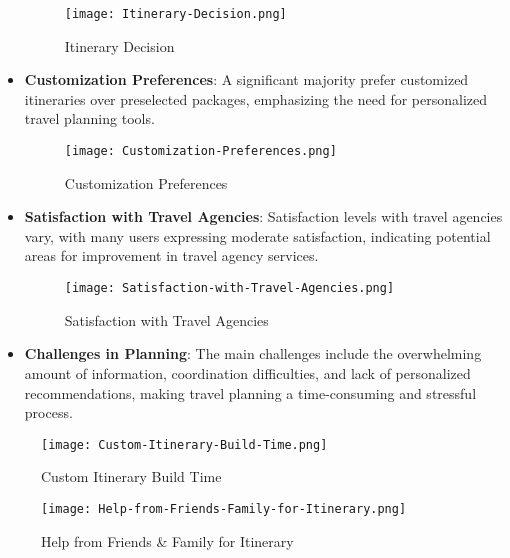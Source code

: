 \documentclass[conference]{IEEEtran}
\begin{document}
\begin{itemize}
\begin{figure}
                \centering
                \texttt{[image: Itinerary-Decision.png]}
                \caption{Itinerary Decision}
                \label{fig:itenary-decision}
            \end{figure}
            \item \textbf{Customization Preferences}: A significant majority prefer customized itineraries over preselected packages, emphasizing the need for personalized travel planning tools.
            \begin{figure}
                \centering
                \texttt{[image: Customization-Preferences.png]}
                \caption{Customization Preferences}
                \label{fig:customization-preferences}
            \end{figure}
            \item \textbf{Satisfaction with Travel Agencies}: Satisfaction levels with travel agencies vary, with many users expressing moderate satisfaction, indicating potential areas for improvement in travel agency services.
            \begin{figure}
                \centering
                \texttt{[image: Satisfaction-with-Travel-Agencies.png]}
                \caption{Satisfaction with Travel Agencies}
                \label{fig:satisfaction-with-travel-agencies}
            \end{figure}
            \item \textbf{Challenges in Planning}: The main challenges include the overwhelming amount of information, coordination difficulties, and lack of personalized recommendations, making travel planning a time-consuming and stressful process.
        \end{itemize}
            \begin{figure}
                \centering
                \texttt{[image: Custom-Itinerary-Build-Time.png]}
                \caption{Custom Itinerary Build Time}
                \label{fig:custom-itinerary-build-time}
            \end{figure}
            \begin{figure}
                \centering
                \texttt{[image: Help-from-Friends-Family-for-Itinerary.png]}
                \caption{Help from Friends & Family for Itinerary}
                \label{fig:help-from-friends-family-for-itinerary}
            \end{figure}
\end{document}
